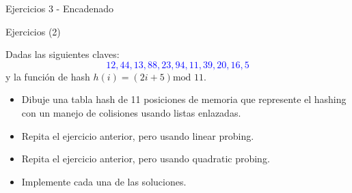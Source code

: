 \documentclass[handout]{beamer} %
\newcommand{\blue}[1]{\textcolor{blue}{#1}}
\begin{document}
  \begin{frame}{Ejercicios 3 - Encadenado}
  \end{frame}

\begin{frame}{Ejercicios (2)}

    Dadas las siguientes claves:
    \blue{$$12, 44, 13, 88, 23, 94, 11, 39, 20, 16, 5$$}
    y la función de hash $h(i)=(2i+5)\mbox{mod }11$.

    \begin{itemize}
        \item Dibuje una tabla hash de 11 posiciones de memoria que represente el hashing con un manejo de colisiones usando listas enlazadas.
        \item Repita el ejercicio anterior, pero usando linear probing.
        \item Repita el ejercicio anterior, pero usando quadratic probing.
        \item Implemente cada una de las soluciones.
    \end{itemize}
\end{frame}
\end{document}
